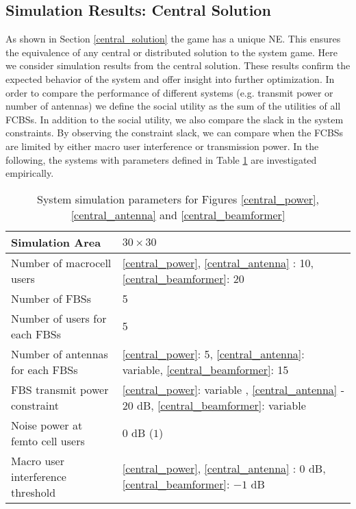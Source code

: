 \subsection{Simulation Results: Central Solution}
As shown in Section \ref{central_solution} the game has a unique NE. This ensures the equivalence of any central or distributed solution to the system game. Here we consider simulation results from the central solution. These results confirm the expected behavior of the system and offer insight into further optimization. In order to compare the performance of different systems (e.g. transmit power or number of antennas) we define the social utility as the sum of the utilities of all FCBSs. In addition to the social utility, we also compare the slack in the system constraints. By observing the constraint slack, we can compare when the FCBSs are limited by either macro user interference or transmission power. In the following, the systems with parameters defined in Table \ref{table1} are investigated empirically. 

\begin{table}[H]
\centering
\begin{tabular}{ | m{8cm} | m{5cm} | } 
\hline
Simulation Area & $30 \times 30$\\ 
\hline
Number of macrocell users & \ref{central_power}, \ref{central_antenna} : 10, \ref{central_beamformer}: 20\\ 
\hline
Number of FBSs & 5\\ 
\hline
Number of users for each FBSs & 5\\ 
\hline
Number of antennas for each FBSs & \ref{central_power}: 5, \ref{central_antenna}: variable, \ref{central_beamformer}: 15 \\ 
\hline
FBS transmit power constraint & \ref{central_power}: variable , \ref{central_antenna} - $20$ dB, \ref{central_beamformer}: variable   \\ 
\hline
Noise power at femto cell users & $0$ dB ($1$)\\ 
\hline
Macro user interference threshold & \ref{central_power}, \ref{central_antenna} : $0$ dB, \ref{central_beamformer}: $-1$ dB\\ 
\hline
\end{tabular}
\caption{\label{table1} System simulation parameters for Figures \ref{central_power}, \ref{central_antenna} and \ref{central_beamformer}}
\end{table}


